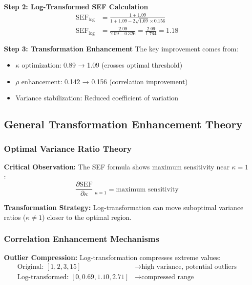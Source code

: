 \textbf{Step 2: Log-Transformed SEF Calculation}
\begin{align}
\text{SEF}_{\log} &= \frac{1 + 1.09}{1 + 1.09 - 2\sqrt{1.09} \times 0.156} \\
\text{SEF}_{\log} &= \frac{2.09}{2.09 - 0.326} = \frac{2.09}{1.764} = 1.18
\end{align}

\textbf{Step 3: Transformation Enhancement}
The key improvement comes from:
\begin{itemize}
    \item $\kappa$ optimization: 0.89 → 1.09 (crosses optimal threshold)
    \item $\rho$ enhancement: 0.142 → 0.156 (correlation improvement)
    \item Variance stabilization: Reduced coefficient of variation
\end{itemize}

\subsection{General Transformation Enhancement Theory}

\subsubsection{Optimal Variance Ratio Theory}

\textbf{Critical Observation:} The SEF formula shows maximum sensitivity near $\kappa = 1$:
\begin{equation}
\frac{\partial \text{SEF}}{\partial \kappa}\bigg|_{\kappa=1} = \text{maximum sensitivity}
\end{equation}

\textbf{Transformation Strategy:} Log-transformation can move suboptimal variance ratios ($\kappa \neq 1$) closer to the optimal region.

\subsubsection{Correlation Enhancement Mechanisms}

\textbf{Outlier Compression:} Log-transformation compresses extreme values:
\begin{align}
\text{Original: } [1, 2, 3, 15] &\rightarrow \text{high variance, potential outliers} \\
\text{Log-transformed: } [0, 0.69, 1.10, 2.71] &\rightarrow \text{compressed range}
\end{align}

